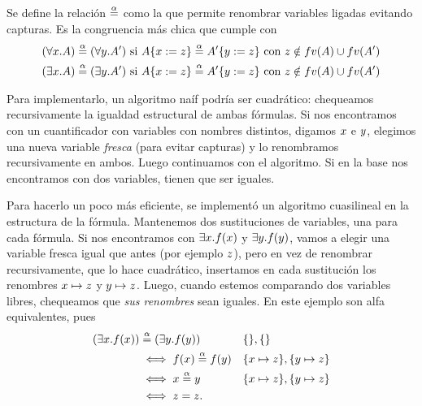 \begin{definition} Se define la relación $\overset{\alpha}{=}$ como la que permite renombrar variables ligadas evitando capturas. Es la congruencia más chica que cumple con
\begin{align*}
    (\forall x . A) \overset{\alpha}{=} (\forall y . A')
        &\text{ si }
        A \{x := z\} \overset{\alpha}{=}
        A' \{y := z\} \text{ con } z \notin fv(A) \cup fv(A')
        \\
    (\exists x . A) \overset{\alpha}{=} (\exists y . A')
        &\text{ si }
        A \{x := z\} \overset{\alpha}{=}
        A' \{y := z\} \text{ con } z \notin fv(A) \cup fv(A')
        \\
\end{align*}
\end{definition}
Para implementarlo, un algoritmo naíf podría ser cuadrático: chequeamos recursivamente la igualdad estructural de ambas fórmulas. Si nos encontramos con un cuantificador con variables con nombres distintos, digamos $x$ e $y$, elegimos una nueva variable \textit{fresca} (para evitar capturas) y lo renombramos recursivamente en ambos. Luego continuamos con el algoritmo. Si en la base nos encontramos con dos variables, tienen que ser iguales.

Para hacerlo un poco más eficiente, se implementó un algoritmo cuasilineal en la estructura de la fórmula. Mantenemos dos sustituciones de variables, una para cada fórmula. Si nos encontramos con $\exists x . f(x)$ y $\exists y . f(y)$, vamos a elegir una variable fresca igual que antes (por ejemplo $z$), pero en vez de renombrar recursivamente, que lo hace cuadrático, insertamos en cada sustitución los renombres $x \mapsto z$ y $y \mapsto z$. Luego, cuando estemos comparando dos variables libres, chequeamos que \textit{sus renombres} sean iguales. En este ejemplo son alfa equivalentes, pues
\begin{align*}
    (\exists x . f(x)) &\overset{\alpha}{=} (\exists y . f(y))
    &&\{\}, \{\}
    \\
    &\iff f(x) \overset{\alpha}{=} f(y)
        &&\{x \mapsto z\}, \{y \mapsto z\}\\
    &\iff x \overset{\alpha}{=} y
        &&\{x \mapsto z\}, \{y \mapsto z\}\\
    &\iff z = z.
\end{align*}

